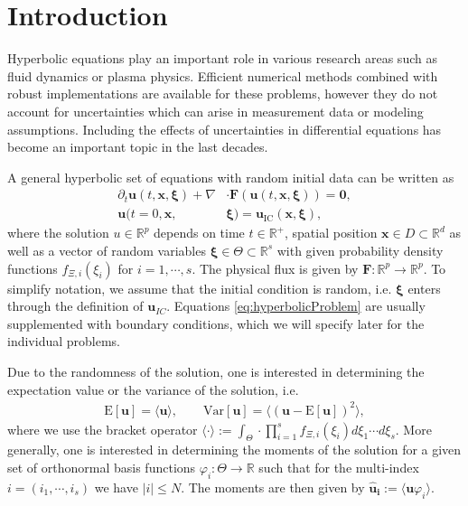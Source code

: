 \section{Introduction}
Hyperbolic equations play an important role in various research areas such as fluid dynamics or plasma physics. Efficient numerical methods combined with robust implementations are available for these problems, however they do not account for uncertainties which can arise in measurement data or modeling assumptions. Including the effects of uncertainties in differential equations has become an important topic in the last decades. %

A general hyperbolic set of equations with random initial data can be written as
\begin{subequations}\label{eq:hyperbolicProblem}
\begin{align}
\partial_t \bm{u}(t,\bm{x},\bm{\xi}) + \nabla&\cdot\bm{F}(\bm{u}(t,\bm{x},\bm{\xi})) = \bm{0}, \\ \label{eq:ic}
\bm{u}(t=0,\bm{x},&\bm{\xi}) = \bm{u}_{\text{IC}}(\bm{x},\bm{\xi}),
\end{align}
\end{subequations}
where the solution $u\in\mathbb{R}^p$ depends on time $t\in\mathbb{R}^+$, spatial position $\bm{x}\in D\subset \mathbb{R}^d$ as well as a vector of random variables $\bm{\xi}\in\Theta\subset\mathbb{R}^s$ with given probability density functions $f_{\Xi,i}(\xi_i)$ for $i = 1,\cdots,s$. The physical flux is given by $\bm{F}:\mathbb{R}^p\to\mathbb{R}^p$. To simplify notation, we assume that the initial condition is random, i.e. $\bm{\xi}$ enters through the definition of $\bm{u}_{IC}$. Equations \eqref{eq:hyperbolicProblem} are usually supplemented with boundary conditions, which we will specify later for the individual problems.

Due to the randomness of the solution, one is interested in determining the expectation value or the variance of the solution, i.e.
\begin{align*}
\text{E}[\bm{u}] = \langle \bm{u} \rangle,\qquad \text{Var}[\bm{u}] = \langle \left( \bm{u}-\text{E}[\bm{u}]\right)^2\rangle,
\end{align*}
where we use the bracket operator $\langle \cdot \rangle := \int_{\Theta} \cdot \prod_{i=1}^s f_{\Xi,i}(\xi_i)d\xi_1 \cdots d\xi_s$. More generally, one is interested in determining the moments of the solution for a given set of orthonormal basis functions $\varphi_{i}:\Theta\to\mathbb{R}$ such that for the multi-index $i = (i_1,\cdots,i_s)$ we have $|i| \leq N$. The moments are then given by $\bm{\hat u_i} := \langle \bm{u}\varphi_i \rangle$.\\

